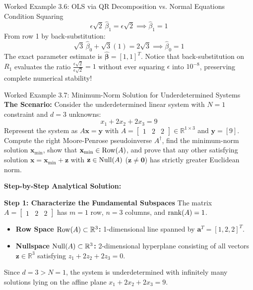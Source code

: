 \begin{examplebox}{Worked Example 3.6: OLS via QR Decomposition vs. Normal Equations Condition Squaring}
\begin{equation*}
\epsilon\sqrt{2}\, \hat{\beta}_1 = \epsilon\sqrt{2} \implies \hat{\beta}_1 = 1
\end{equation*}
From row 1 by back-substitution:
\begin{equation*}
\sqrt{3}\, \hat{\beta}_0 + \sqrt{3}(1) = 2\sqrt{3} \implies \hat{\beta}_0 = 1
\end{equation*}
The exact parameter estimate is $\hat{\boldsymbol{\beta}} = [1, 1]^T$.
Notice that back-substitution on $R_1$ evaluates the ratio $\frac{\epsilon\sqrt{2}}{\epsilon\sqrt{2}} = 1$ without ever squaring $\epsilon$ into $10^{-8}$, preserving complete numerical stability!
\end{examplebox}

\begin{examplebox}{Worked Example 3.7: Minimum-Norm Solution for Underdetermined Systems}
\label{ex:w03_min_norm_underdetermined}
\textbf{The Scenario:}
Consider the underdetermined linear system with $N = 1$ constraint and $d = 3$ unknowns:
\begin{equation*}
x_1 + 2x_2 + 2x_3 = 9
\end{equation*}
Represent the system as $A\mathbf{x} = \mathbf{y}$ with $A = \begin{bmatrix} 1 & 2 & 2 \end{bmatrix} \in \mathbb{R}^{1 \times 3}$ and $\mathbf{y} = [9]$. Compute the right Moore-Penrose pseudoinverse $A^\dagger$, find the minimum-norm solution $\mathbf{x}_{\mathrm{min}}$, show that $\mathbf{x}_{\mathrm{min}} \in \operatorname{Row}(A)$, and prove that any other satisfying solution $\mathbf{x} = \mathbf{x}_{\mathrm{min}} + \mathbf{z}$ with $\mathbf{z} \in \operatorname{Null}(A)$ ($\mathbf{z} \ne \mathbf{0}$) has strictly greater Euclidean norm.

\tcblower
\textbf{Step-by-Step Analytical Solution:}

\textbf{Step 1: Characterize the Fundamental Subspaces}
The matrix $A = \begin{bmatrix} 1 & 2 & 2 \end{bmatrix}$ has $m = 1$ row, $n = 3$ columns, and $\operatorname{rank}(A) = 1$.
\begin{itemize}
    \item \textbf{Row Space $\operatorname{Row}(A) \subset \mathbb{R}^3$:} 1-dimensional line spanned by $\mathbf{a}^T = [1, 2, 2]^T$.
    \item \textbf{Nullspace $\operatorname{Null}(A) \subset \mathbb{R}^3$:} 2-dimensional hyperplane consisting of all vectors $\mathbf{z} \in \mathbb{R}^3$ satisfying $z_1 + 2z_2 + 2z_3 = 0$.
\end{itemize}
Since $d = 3 > N = 1$, the system is underdetermined with infinitely many solutions lying on the affine plane $x_1 + 2x_2 + 2x_3 = 9$.


\end{examplebox}
